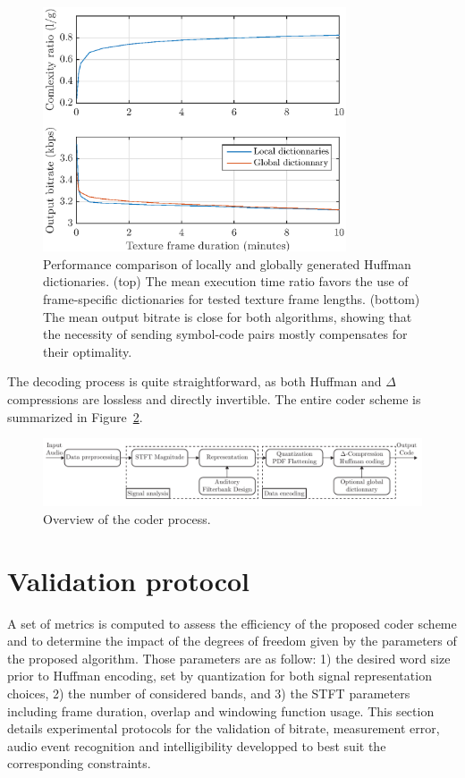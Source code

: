 \documentclass[sensors,article,submit,moreauthors,pdftex,10pt,a4paper]{mdpi}
\begin{document}
\begin{figure}[htbp]
	\centering
		\includegraphics[width=0.8\textwidth]{figures/dict_comp.eps}
	\caption{Performance comparison of locally and globally generated Huffman dictionaries. (top) The mean execution time ratio favors the use of frame-specific dictionaries for tested texture frame lengths. (bottom) The mean output bitrate is close for both algorithms, showing that the necessity of sending symbol-code pairs mostly compensates for their optimality.}
	\label{fig:dict_comp}
\end{figure}

The decoding process is quite straightforward, as both Huffman and $\Delta$ compressions are lossless and directly invertible. The entire coder scheme is summarized in Figure~\ref{fig:scheme}.

\begin{figure}[htbp]
	\centering
		\includegraphics[width=.9\textwidth]{figures/scheme.pdf}
	\caption{Overview of the coder process.}
	\label{fig:scheme}
\end{figure}

\section{Validation protocol} \label{sec:protocol}

A set of metrics is computed to assess the efficiency of the proposed coder scheme and to determine the impact of the degrees of freedom given by the parameters of the proposed algorithm. Those parameters are as follow: 1) the desired word size prior to Huffman encoding, set by quantization for both signal representation choices, 2) the number of considered bands, and 3) the STFT parameters including frame duration, overlap and windowing function usage. This section details experimental protocols for the validation of bitrate, measurement error, audio event recognition and intelligibility developped to best suit the corresponding constraints.
\end{document}
